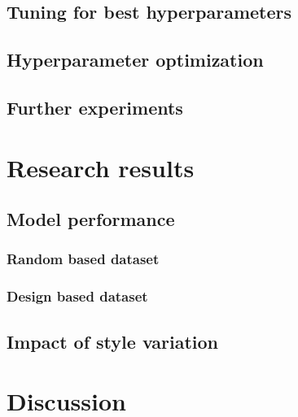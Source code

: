 \documentclass[Bachelor, BIC, english, fhCitStyle, IEEE]{BASE/twbook} %
\begin{document}
\section{Tuning for best hyperparameters}
\section{Hyperparameter optimization}
\section{Further experiments}
\clearpage
\chapter{Research results}
\section{Model performance}
\subsection{Random based dataset}
\subsection{Design based dataset}
\section{Impact of style variation}
\clearpage
\chapter{Discussion}
\clearpage %

\printbib %
\clearpage

\listoffigures %
\clearpage

\listoftables %
\clearpage

\listoflistings %
\clearpage

{}
\end{document}
